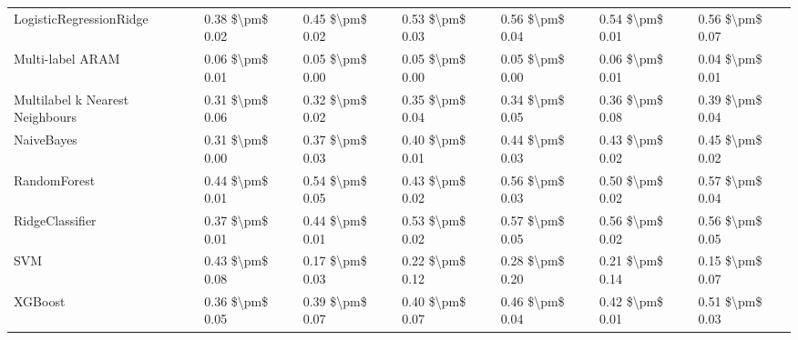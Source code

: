 \begin{tabular}{lllllll}
        LogisticRegressionRidge & 0.38 \$\textbackslash pm\$ 0.02 &           0.45 \$\textbackslash pm\$ 0.02 &       0.53 \$\textbackslash pm\$ 0.03 &        0.56 \$\textbackslash pm\$ 0.04 &                         0.54 \$\textbackslash pm\$ 0.01 & 0.56 \$\textbackslash pm\$ 0.07 \\
               Multi-label ARAM & 0.06 \$\textbackslash pm\$ 0.01 &           0.05 \$\textbackslash pm\$ 0.00 &       0.05 \$\textbackslash pm\$ 0.00 &        0.05 \$\textbackslash pm\$ 0.00 &                         0.06 \$\textbackslash pm\$ 0.01 & 0.04 \$\textbackslash pm\$ 0.01 \\
Multilabel k Nearest Neighbours & 0.31 \$\textbackslash pm\$ 0.06 &           0.32 \$\textbackslash pm\$ 0.02 &       0.35 \$\textbackslash pm\$ 0.04 &        0.34 \$\textbackslash pm\$ 0.05 &                         0.36 \$\textbackslash pm\$ 0.08 & 0.39 \$\textbackslash pm\$ 0.04 \\
                     NaiveBayes & 0.31 \$\textbackslash pm\$ 0.00 &           0.37 \$\textbackslash pm\$ 0.03 &       0.40 \$\textbackslash pm\$ 0.01 &        0.44 \$\textbackslash pm\$ 0.03 &                         0.43 \$\textbackslash pm\$ 0.02 & 0.45 \$\textbackslash pm\$ 0.02 \\
                   RandomForest & 0.44 \$\textbackslash pm\$ 0.01 &           0.54 \$\textbackslash pm\$ 0.05 &       0.43 \$\textbackslash pm\$ 0.02 &        0.56 \$\textbackslash pm\$ 0.03 &                         0.50 \$\textbackslash pm\$ 0.02 & 0.57 \$\textbackslash pm\$ 0.04 \\
                RidgeClassifier & 0.37 \$\textbackslash pm\$ 0.01 &           0.44 \$\textbackslash pm\$ 0.01 &       0.53 \$\textbackslash pm\$ 0.02 &        0.57 \$\textbackslash pm\$ 0.05 &                         0.56 \$\textbackslash pm\$ 0.02 & 0.56 \$\textbackslash pm\$ 0.05 \\
                            SVM & 0.43 \$\textbackslash pm\$ 0.08 &           0.17 \$\textbackslash pm\$ 0.03 &       0.22 \$\textbackslash pm\$ 0.12 &        0.28 \$\textbackslash pm\$ 0.20 &                         0.21 \$\textbackslash pm\$ 0.14 & 0.15 \$\textbackslash pm\$ 0.07 \\
                        XGBoost & 0.36 \$\textbackslash pm\$ 0.05 &           0.39 \$\textbackslash pm\$ 0.07 &       0.40 \$\textbackslash pm\$ 0.07 &        0.46 \$\textbackslash pm\$ 0.04 &                         0.42 \$\textbackslash pm\$ 0.01 & 0.51 \$\textbackslash pm\$ 0.03 \\
\bottomrule
\end{tabular}
